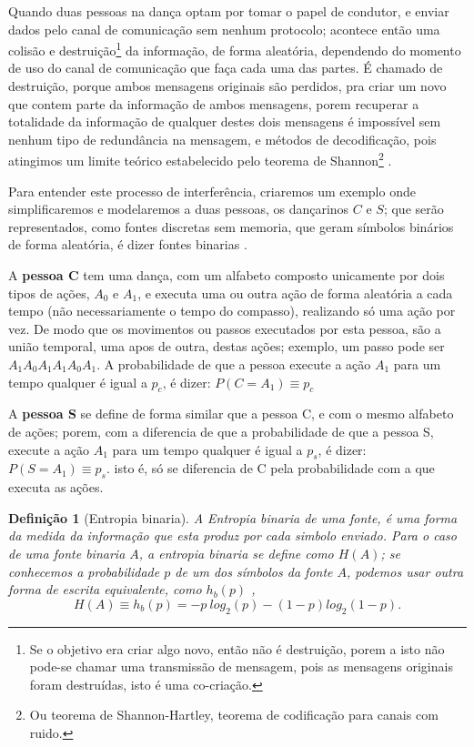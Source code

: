 \documentclass[a4paper,10pt]{article}
\newtheorem{mydef}{Definição}
\begin{document}
Quando duas pessoas na dança optam por tomar o papel de condutor, 
e enviar dados pelo canal de comunicação sem nenhum protocolo;
acontece então uma colisão e destruição\footnote{Se o objetivo era criar algo novo, então não é destruição, 
porem a isto não pode-se chamar uma transmissão de mensagem, 
pois as mensagens originais foram destruídas, isto é uma co-criação.} 
da informação, de forma aleatória,
dependendo do momento de uso do canal de comunicação que faça cada uma das partes. 
É chamado de destruição, porque ambos mensagens originais são perdidos,
pra criar um novo que contem parte da informação de ambos mensagens,
porem recuperar a totalidade da informação de qualquer destes dois mensagens é 
impossível sem nenhum tipo de redundância na mensagem, e métodos de decodificação,
pois atingimos um limite teórico estabelecido pelo 
teorema de Shannon\footnote{Ou teorema de Shannon-Hartley, teorema de codificação para canais com ruido.} 
\cite[pp. 22]{vanLint2012introduction}. 


Para entender este processo de interferência, 
criaremos um exemplo onde  simplificaremos e modelaremos a duas pessoas, 
os dançarinos  $C$ e $S$;
que serão representados, como fontes discretas sem memoria, que geram símbolos binários de forma aleatória,
é dizer fontes binarias \cite[pp. 90]{reza2012introduction}.

A \textbf{pessoa C} tem uma dança, com um alfabeto composto unicamente por dois tipos de ações,
$A_0$ e $A_1$, e executa uma ou outra ação de forma aleatória a cada tempo 
(não necessariamente o tempo do compasso), realizando só uma ação por vez. 
De modo que os movimentos ou passos executados por esta pessoa, 
são a união temporal, uma apos de outra, destas ações; 
exemplo, um passo pode ser $A_1 A_0 A_1 A_1 A_0 A_1$.
A probabilidade de que a pessoa execute a ação $A_1$ para um tempo qualquer é
igual a $p_c$, é dizer: $P(C=A_1)\equiv p_c$  


A \textbf{pessoa S} se define de forma similar que a pessoa C, e com o mesmo alfabeto de ações;
porem, com a diferencia de que a probabilidade de que a pessoa S, 
execute a ação $A_1$ para um tempo qualquer é
igual a $p_s$, é dizer: $P(S=A_1)\equiv p_s$.
isto é, só se diferencia de C pela probabilidade com a que executa as ações.


\begin{mydef}[Entropia binaria]
A Entropia binaria de uma fonte, 
é uma forma da medida da informação que esta produz por cada simbolo enviado. 
Para o caso de uma fonte binaria $A$, 
a entropia binaria se define como $H(A)$;
se conhecemos a probabilidade $p$ de um dos símbolos da fonte $A$, 
podemos usar outra forma de escrita equivalente, como $h_b(p)$ \cite[pp. 90]{reza2012introduction} \cite[pp. 5]{cover2012elements},
\begin{equation}
H(A)\equiv h_b(p)=-p~log_2(p)-(1-p)log_2(1-p).
\end{equation}
\end{mydef}
\end{document}
